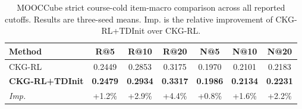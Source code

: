 \begin{table}[t]
\centering
{
\small
\setlength{\tabcolsep}{5.0pt}
\renewcommand{\arraystretch}{0.98}
\begin{tabular*}{\textwidth}{@{\extracolsep{\fill}}lcccccc}
\toprule
Method & R@5 & R@10 & R@20 & N@5 & N@10 & N@20 \\
\midrule
CKG-RL & 0.2449 & 0.2853 & 0.3175 & 0.1970 & 0.2101 & 0.2183 \\
\textbf{CKG-RL+TDInit} & \textbf{0.2479} & \textbf{0.2934} & \textbf{0.3317} & \textbf{0.1986} & \textbf{0.2134} & \textbf{0.2231} \\
\midrule
\emph{Imp.} & +1.2\% & +2.9\% & +4.4\% & +0.8\% & +1.6\% & +2.2\% \\
\bottomrule
\end{tabular*}
}
\caption{MOOCCube strict course-cold item-macro comparison across all reported cutoffs. Results are three-seed means. Imp. is the relative improvement of CKG-RL+TDInit over CKG-RL.}
\label{tab:ckg-rl-tdinit-all-metrics}
\end{table}
